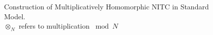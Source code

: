 \begin{figure}[h!]
\begin{center}
\begin{tabular}{|ll|}

\hline          
\end{tabular}
\caption{Construction of Multiplicatively Homomorphic NITC in Standard Model. \\ $\otimes_N$ refers to multiplication $\bmod N$}
\label{table:nitc-mh}
\end{center}
\end{figure}

